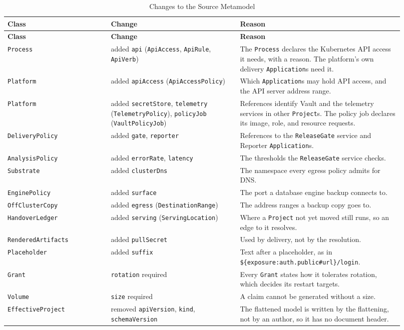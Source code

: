 \begin{longtable}{>{\raggedright\arraybackslash}p{0.24\linewidth}>{\raggedright\arraybackslash}p{0.30\linewidth}>{\raggedright\arraybackslash}p{0.38\linewidth}}
\hline
\textbf{Class} & \textbf{Change} & \textbf{Reason} \\
\hline
\endfirsthead
\hline
\textbf{Class} & \textbf{Change} & \textbf{Reason} \\
\hline
\endhead
\hline
\endfoot
\hline
\caption{Changes to the Source Metamodel}
\label{tab:sourcechanges}
\endlastfoot
\texttt{Process} & added \texttt{api} (\texttt{ApiAccess}, \texttt{ApiRule}, \texttt{ApiVerb}) & The \texttt{Process} declares the Kubernetes API access it needs, with a reason. The platform's own delivery \texttt{Application}s need it. \\
\texttt{Platform} & added \texttt{apiAccess} (\texttt{ApiAccessPolicy}) & Which \texttt{Application}s may hold API access, and the API server address range. \\
\texttt{Platform} & added \texttt{secretStore}, \texttt{telemetry} (\texttt{TelemetryPolicy}), \texttt{policyJob} (\texttt{VaultPolicyJob}) & References identify Vault and the telemetry services in other \texttt{Project}s. The policy job declares its image, role, and resource requests. \\
\texttt{DeliveryPolicy} & added \texttt{gate}, \texttt{reporter} & References to the \texttt{ReleaseGate} service and Reporter \texttt{Application}s. \\
\texttt{AnalysisPolicy} & added \texttt{errorRate}, \texttt{latency} & The thresholds the \texttt{ReleaseGate} service checks. \\
\texttt{Substrate} & added \texttt{clusterDns} & The namespace every egress policy admits for DNS. \\
\texttt{EnginePolicy} & added \texttt{surface} & The port a database engine backup connects to. \\
\texttt{OffClusterCopy} & added \texttt{egress} (\texttt{DestinationRange}) & The address ranges a backup copy goes to. \\
\texttt{HandoverLedger} & added \texttt{serving} (\texttt{ServingLocation}) & Where a \texttt{Project} not yet moved still runs, so an edge to it resolves. \\
\texttt{RenderedArtifacts} & added \texttt{pullSecret} & Used by delivery, not by the resolution. \\
\texttt{Placeholder} & added \texttt{suffix} & Text after a placeholder, as in \texttt{\$\{exposure:auth.public\#url\}/login}. \\
\texttt{Grant} & \texttt{rotation} required & Every \texttt{Grant} states how it tolerates rotation, which decides its restart targets. \\
\texttt{Volume} & \texttt{size} required & A claim cannot be generated without a size. \\
\texttt{EffectiveProject} & removed \texttt{apiVersion}, \texttt{kind}, \texttt{schemaVersion} & The flattened model is written by the flattening, not by an author, so it has no document header. \\
\end{longtable}

